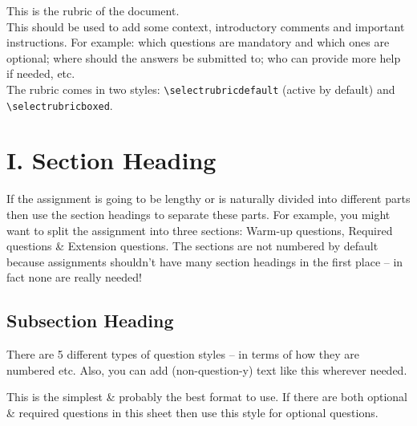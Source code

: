 \documentclass[11pt]{noether}
\author{Author M. Name}
\institute{Maths \& Physics}
\begin{document}
\maketitle

\begin{rubric}
  This is the rubric of the document.\\
  This should be used to add some context, introductory comments and important instructions. For example: which questions are mandatory and which ones are optional; where should the answers be submitted to; who can provide more help if needed, etc.\\
  The rubric comes in two styles: \small{\verb+\selectrubricdefault+} (active by default) and \small{\verb+\selectrubricboxed+}.
\end{rubric}

\section{I. Section Heading}
If the assignment is going to be lengthy or is naturally divided into different parts then use the section headings to separate these parts. For example, you might want to split the assignment into three sections: Warm-up questions, Required questions \& Extension questions. The sections are not numbered by default because assignments shouldn't have many section headings in the first place -- in fact none are really needed!

\subsection{Subsection Heading}

There are 5 different types of question styles -- in terms of how they are numbered etc. Also, you can add (non-question-y) text like this wherever needed.

\begin{nquest}
  This is the simplest \& probably the best format to use. If there are both optional \& required questions in this sheet then use this style for optional questions. 
\end{nquest}
\end{document}
